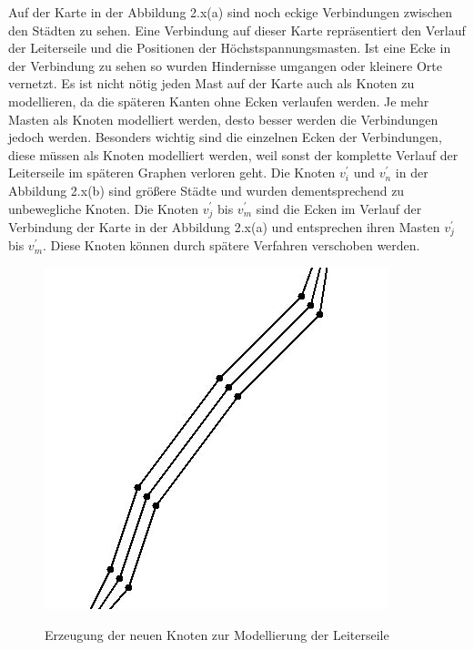 Auf der Karte in der Abbildung 2.x(a) sind noch eckige Verbindungen zwischen den Städten zu sehen. Eine Verbindung auf dieser Karte repräsentiert den Verlauf der Leiterseile und die Positionen der Höchstspannungsmasten. Ist eine Ecke in der Verbindung zu sehen so wurden Hindernisse umgangen oder kleinere Orte vernetzt. Es ist nicht nötig jeden Mast auf der Karte auch als Knoten zu modellieren, da die späteren Kanten ohne Ecken verlaufen werden. Je mehr Masten als Knoten modelliert werden, desto besser werden die Verbindungen jedoch werden. Besonders wichtig sind die einzelnen Ecken der Verbindungen, diese müssen als Knoten modelliert werden, weil sonst der komplette Verlauf der Leiterseile im späteren Graphen verloren geht. Die Knoten $v_{i}^{'}$ und $v_{n}^{'}$ in der Abbildung 2.x(b) sind größere Städte und wurden dementsprechend zu unbewegliche Knoten. Die Knoten $v_{j}^{'}$ bis $v_{m}^{'}$ sind die Ecken im Verlauf der Verbindung der Karte in der Abbildung 2.x(a) und entsprechen ihren Masten $v_{j}^{'}$ bis $v_{m}^{'}$. Diese Knoten können durch spätere Verfahren verschoben werden. \\
\begin{figure}[t]
	\centering
	{\includegraphics[scale=0.7]{bilder/knotenplacement}\label{fig_knotenplacement}
	}\\
	\caption[Erzeugung der neuen Knoten zur Modellierung der Leiterseile]{Erzeugung der neuen Knoten zur Modellierung der Leiterseile}
	\label{fig_knotenplacement}
\end{figure}

